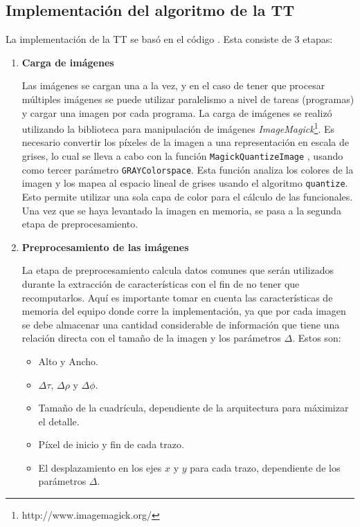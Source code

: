 \subsection{Implementación del algoritmo de la TT}

La implementación de la TT se basó en el código \cite{Garita2014}. Esta consiste de 3 etapas: 

\begin{enumerate}
    
    \item \textbf{Carga de imágenes}
    
    Las imágenes se cargan una a la vez, y en el caso de tener que procesar múltiples imágenes se puede utilizar paralelismo a nivel de tareas (programas) y cargar una imagen por cada programa.
    La carga de imágenes se realizó utilizando la biblioteca para manipulación de imágenes \textit{ImageMagick}\footnote{http://www.imagemagick.org/}. Es necesario convertir los píxeles de la imagen a una representación en escala de grises, lo cual se lleva a cabo con la función \texttt{MagickQuantizeImage} \cite{ImageMagick2015}, usando como tercer parámetro \texttt{GRAYColorspace}. Esta función analiza los colores de la imagen y los mapea al espacio lineal de grises usando el algoritmo \texttt{quantize}\cite{quantize2015}. Esto permite utilizar una sola capa de color para el cálculo de las funcionales. Una vez que se haya levantado la imagen en memoria, se pasa a la segunda etapa de preprocesamiento.
    
    
    \item \textbf{Preprocesamiento de las imágenes}
    
    La etapa de preprocesamiento calcula datos comunes que serán utilizados durante la extracción de características con el fin de no tener que recomputarlos. Aquí es importante tomar en cuenta las características de memoria del equipo donde corre la implementación, ya que por cada imagen se debe almacenar una cantidad considerable de información que tiene una relación directa con el tamaño de la imagen y los parámetros $\Delta$. Estos son:
    \begin{itemize}
        \item Alto y Ancho.
        \item $\Delta \tau$, $\Delta \rho$ y $\Delta \phi$.
        \item Tamaño de la cuadrícula, dependiente de la arquitectura para máximizar el detalle.
        \item Píxel de inicio y fin de cada trazo.
        \item El desplazamiento en los ejes $x$ y $y$ para cada trazo, dependiente de los parámetros $\Delta$.
    \end{itemize}
    

\end{enumerate}
